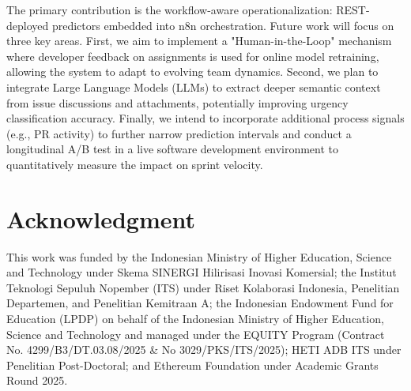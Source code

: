 \documentclass[conference]{IEEEtran}
\begin{document}
The primary contribution is the workflow-aware operationalization: REST-deployed predictors embedded into n8n orchestration. Future work will focus on three key areas. First, we aim to implement a "Human-in-the-Loop" mechanism where developer feedback on assignments is used for online model retraining, allowing the system to adapt to evolving team dynamics. Second, we plan to integrate Large Language Models (LLMs) to extract deeper semantic context from issue discussions and attachments, potentially improving urgency classification accuracy. Finally, we intend to incorporate additional process signals (e.g., PR activity) to further narrow prediction intervals and conduct a longitudinal A/B test in a live software development environment to quantitatively measure the impact on sprint velocity.

\section*{Acknowledgment}

This work was funded by the Indonesian Ministry of Higher Education, Science and Technology under Skema SINERGI Hilirisasi Inovasi Komersial; the Institut Teknologi Sepuluh Nopember (ITS) under Riset Kolaborasi Indonesia, Penelitian Departemen, and Penelitian Kemitraan A; the Indonesian Endowment Fund for Education (LPDP) on behalf of the Indonesian Ministry of Higher Education, Science and Technology and managed under the EQUITY Program (Contract No. 4299/B3/DT.03.08/2025 & No 3029/PKS/ITS/2025); HETI ADB ITS under Penelitian Post-Doctoral; and Ethereum Foundation under Academic Grants Round 2025.

\end{document}
